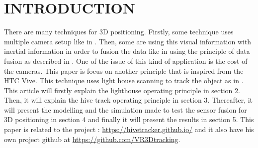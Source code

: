 \documentclass{vldb}
\begin{document}
\section{INTRODUCTION}
There are many techniques for 3D positioning. Firstly, some technique uses multiple camera setup like in \cite{lee2013real}. Then, some are using this visual information with inertial information in order to fusion the data like in \cite{bleser2009advanced} using the principle of data fusion as described in \cite{chair1986optimal}. One of the issue of this kind of application is the cost of the cameras. This paper is focus on another principle that is inspired from the HTC Vive. This technique uses light house scanning to track the object as in \cite{kreylos2016lighthouse}. This article will firstly explain the lighthouse operating principle in section 2. Then, it will explain the hive track operating principle in section 3. Thereafter, it will present the modelling and the simulation made to test the sensor fusion for 3D positioning in section 4 and finally it will present the results in section 5. This paper is related to the project : \url{https://hivetracker.github.io/} and it also have his own project github at \url{https://github.com/VR3Dtracking}.
\end{document}
